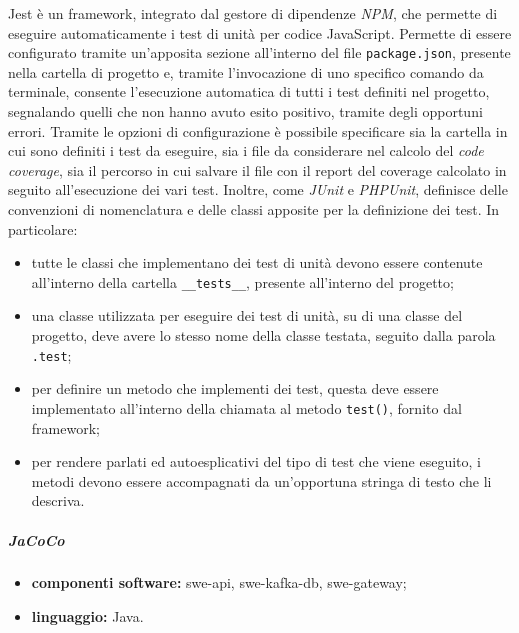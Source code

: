 				Jest è un framework, integrato dal gestore di dipendenze \textit{NPM}, che permette di eseguire automaticamente i test di unità per codice JavaScript.
				\newline
				Permette di essere configurato tramite un'apposita sezione all'interno del file \verb!package.json!, presente nella cartella di progetto e, tramite l'invocazione di uno specifico comando da terminale, consente l'esecuzione automatica di tutti i test definiti nel progetto, segnalando quelli che non hanno avuto esito positivo, tramite degli opportuni errori.
				\newline
				Tramite le opzioni di configurazione è possibile specificare sia la cartella in cui sono definiti i test da eseguire, sia i file da considerare nel calcolo del \textit{code coverage}, sia il percorso in cui salvare il file con il report del coverage calcolato in seguito all'esecuzione dei vari test.
				\newline
				Inoltre, come \textit{JUnit} e \textit{PHPUnit}, definisce delle convenzioni di nomenclatura e delle classi apposite per la definizione dei test. In particolare:
				\begin{itemize}
					\item tutte le classi che implementano dei test di unità devono essere contenute all'interno della cartella \verb!__tests__!, presente all'interno del progetto;
					\item una classe utilizzata per eseguire dei test di unità, su di una classe del progetto, deve avere lo stesso nome della classe testata, seguito dalla parola \verb!.test!;
					\item per definire un metodo che implementi dei test, questa deve essere implementato all'interno della chiamata al metodo \verb!test()!, fornito dal framework;
					\item per rendere parlati ed autoesplicativi del tipo di test che viene eseguito, i metodi devono essere accompagnati da un'opportuna stringa di testo che li descriva.
				\end{itemize}
			
			\subparagraph{JaCoCo}
			
				\begin{itemize}
					\item \textbf{componenti software:} swe-api, swe-kafka-db, swe-gateway;
					\item \textbf{linguaggio:} Java.
				\end{itemize}
				
